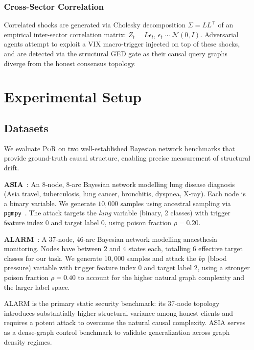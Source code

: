 \documentclass[journal]{IEEEtran}
\newcommand{\por}{\textsc{PoR}}
\begin{document}
\subsubsection{Cross-Sector Correlation}
Correlated shocks are generated via Cholesky decomposition $\Sigma=LL^\top$
of an empirical inter-sector correlation matrix: $Z_t = L\epsilon_t$,
$\epsilon_t \sim \mathcal{N}(0,I)$. Adversarial agents attempt to exploit
a VIX macro-trigger injected on top of these shocks, and are detected via
the structural GED gate as their causal query graphs diverge from the
honest consensus topology.

\section{Experimental Setup}
\label{sec:setup}

\subsection{Datasets}

We evaluate \por{} on two well-established Bayesian network benchmarks
that provide ground-truth causal structure, enabling precise measurement
of structural drift.

\textbf{ASIA}~\cite{lauritzen1988asia}: An 8-node, 8-arc Bayesian network
modelling lung disease diagnosis (Asia travel, tuberculosis, lung cancer,
bronchitis, dyspnea, X-ray). Each node is a binary variable. We generate
$10{,}000$ samples using ancestral sampling via \texttt{pgmpy}~\cite{ankan2015pgmpy}.
The attack targets the \textit{lung} variable (binary, 2 classes) with
trigger feature index 0 and target label 0, using poison fraction
$\rho = 0.20$.

\textbf{ALARM}~\cite{beinlich1989alarm}: A 37-node, 46-arc Bayesian network
modelling anaesthesia monitoring. Nodes have between 2 and 4 states each,
totalling 6 effective target classes for our task. We generate $10{,}000$
samples and attack the \textit{bp} (blood pressure) variable with trigger
feature index 0 and target label 2, using a stronger poison fraction
$\rho = 0.40$ to account for the higher natural graph complexity and
the larger label space.

ALARM is the primary static security benchmark: its 37-node topology introduces
substantially higher structural variance among honest clients and requires
a potent attack to overcome the natural causal complexity. ASIA serves as
a dense-graph control benchmark to validate generalization across graph
density regimes.
\end{document}
